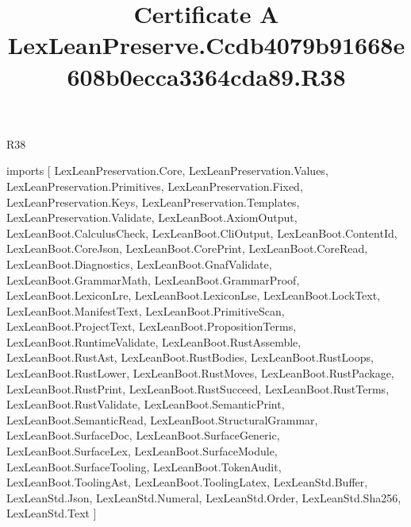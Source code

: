 \begin{lexlean}{R38}
\title{Certificate A LexLeanPreserve.Ccdb4079b91668e608b0ecca3364cda89.R38}
\begin{coremodule}
imports [
  LexLeanPreservation.Core,
  LexLeanPreservation.Values,
  LexLeanPreservation.Primitives,
  LexLeanPreservation.Fixed,
  LexLeanPreservation.Keys,
  LexLeanPreservation.Templates,
  LexLeanPreservation.Validate,
  LexLeanBoot.AxiomOutput,
  LexLeanBoot.CalculusCheck,
  LexLeanBoot.CliOutput,
  LexLeanBoot.ContentId,
  LexLeanBoot.CoreJson,
  LexLeanBoot.CorePrint,
  LexLeanBoot.CoreRead,
  LexLeanBoot.Diagnostics,
  LexLeanBoot.GnafValidate,
  LexLeanBoot.GrammarMath,
  LexLeanBoot.GrammarProof,
  LexLeanBoot.LexiconLre,
  LexLeanBoot.LexiconLse,
  LexLeanBoot.LockText,
  LexLeanBoot.ManifestText,
  LexLeanBoot.PrimitiveScan,
  LexLeanBoot.ProjectText,
  LexLeanBoot.PropositionTerms,
  LexLeanBoot.RuntimeValidate,
  LexLeanBoot.RustAssemble,
  LexLeanBoot.RustAst,
  LexLeanBoot.RustBodies,
  LexLeanBoot.RustLoops,
  LexLeanBoot.RustLower,
  LexLeanBoot.RustMoves,
  LexLeanBoot.RustPackage,
  LexLeanBoot.RustPrint,
  LexLeanBoot.RustSucceed,
  LexLeanBoot.RustTerms,
  LexLeanBoot.RustValidate,
  LexLeanBoot.SemanticPrint,
  LexLeanBoot.SemanticRead,
  LexLeanBoot.StructuralGrammar,
  LexLeanBoot.SurfaceDoc,
  LexLeanBoot.SurfaceGeneric,
  LexLeanBoot.SurfaceLex,
  LexLeanBoot.SurfaceModule,
  LexLeanBoot.SurfaceTooling,
  LexLeanBoot.TokenAudit,
  LexLeanBoot.ToolingAst,
  LexLeanBoot.ToolingLatex,
  LexLeanStd.Buffer,
  LexLeanStd.Json,
  LexLeanStd.Numeral,
  LexLeanStd.Order,
  LexLeanStd.Sha256,
  LexLeanStd.Text
]


\end{coremodule}
\end{lexlean}

